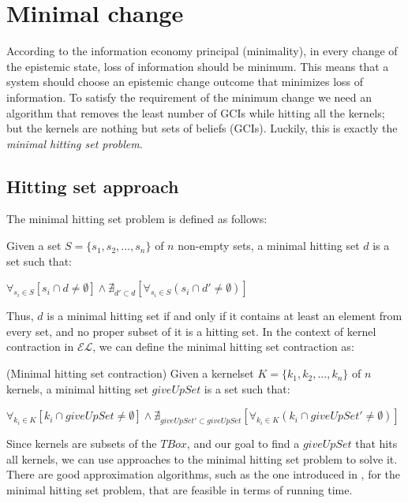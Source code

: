 \section{Minimal change}
According to the information economy principal (minimality), in every change of the epistemic state, loss of information should be minimum\cite{econ}. This means that a system should choose an epistemic change outcome that minimizes loss of information. To satisfy the requirement of the minimum change we need an algorithm that removes the least number of GCIs while hitting all the kernels; but the kernels are nothing but sets of beliefs (GCIs). Luckily, this is exactly the \textit{minimal hitting set problem}. 

\subsection{Hitting set approach}
The minimal hitting set problem is defined as follows:
\begin{defn}\cite{hit}
Given a set $S=\{s_{1}, s_{2}, ..., s_{n}\}$ of $n$ non-empty sets, a minimal hitting set $d$ is a set such that:
\begin{center}
$\forall_{s_{i} \in S} [ s_{i} \cap d \neq \emptyset] \wedge \nexists_{d' \subset d}[\forall_{s_{i} \in S} (s_{i} \cap d' \neq \emptyset) ]$
\end{center}
\end{defn}

Thus, $d$ is a minimal hitting set if and only if it contains at least an element from every set, and no proper subset of it is a hitting set. In the context of kernel contraction in $\mathcal{EL}$, we can define the minimal hitting set contraction as:
\begin{defn}(Minimal hitting set contraction)
Given a kernelset $K=\{k_{1}, k_{2}, ..., k_{n}\}$ of $n$ kernels, a minimal hitting set $giveUpSet$ is a set such that:
\begin{center}
$\forall_{k_{i} \in K} [ k_{i} \cap giveUpSet \neq \emptyset] \wedge \nexists_{giveUpSet' \subset giveUpSet}[\forall_{k_{i} \in K} (k_{i} \cap giveUpSet' \neq \emptyset) ]$
\end{center}
\end{defn}

Since kernels are subsets of the $TBox$, and our goal to find a $giveUpSet$ that hits all kernels, we can use approaches to the minimal hitting set problem to solve it. There are good approximation algorithms, such as the one introduced in \cite{hit}, for the minimal hitting set problem, that are feasible in terms of running time. 

